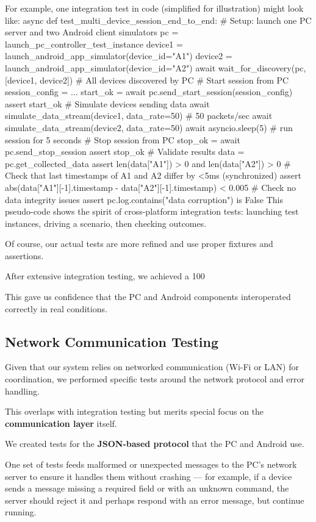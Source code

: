 {{{For example, one integration test in code (simplified for illustration) might look like: async def test\_multi\_device\_session\_end\_to\_end: # Setup: launch one PC server and two Android client simulators pc = launch\_pc\_controller\_test\_instance device1 = launch\_android\_app\_simulator(device\_id="A1") device2 = launch\_android\_app\_simulator(device\_id="A2") await wait\_for\_discovery(pc, [device1, device2]) # All devices discovered by PC # Start session from PC session\_config = {...} start\_ok = await pc.send\_start\_session(session\_config) assert start\_ok # Simulate devices sending data await simulate\_data\_stream(device1, data\_rate=50) # 50 packets/sec await simulate\_data\_stream(device2, data\_rate=50) await asyncio.sleep(5) # run session for 5 seconds # Stop session from PC stop\_ok = await pc.send\_stop\_session assert stop\_ok # Validate results data = pc.get\_collected\_data assert len(data["A1"]) > 0 and len(data["A2"]) > 0 # Check that last timestamps of A1 and A2 differ by <5ms (synchronized) assert abs(data["A1"][-1].timestamp - data["A2"][-1].timestamp) < 0.005 # Check no data integrity issues assert pc.log.contains("data corruption") is False This pseudo-code shows the spirit of cross-platform integration tests: launching test instances, driving a scenario, then checking outcomes.

Of course, our actual tests are more refined and use proper fixtures and assertions.

After extensive integration testing, we achieved a 100%

This gave us confidence that the PC and Android components interoperated correctly in real conditions.

\subsection{Network Communication Testing}

Given that our system relies on networked communication (Wi-Fi or LAN) for coordination, we performed specific tests around the network protocol and error handling.

This overlaps with integration testing but merits special focus on the \textbf{communication layer}
 itself.

We created tests for the \textbf{JSON-based protocol}
 that the PC and Android use.

One set of tests feeds malformed or unexpected messages to the PC's network server to ensure it handles them without crashing --- for example, if a device sends a message missing a required field or with an unknown command, the server should reject it and perhaps respond with an error message, but continue running.

}}}
